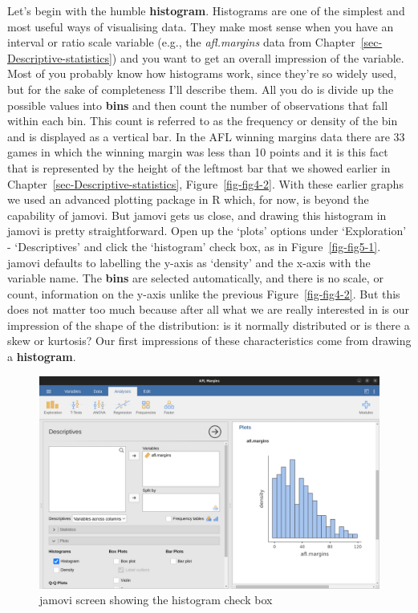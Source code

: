 \documentclass[
  a4paper,
]{book}
\begin{document}
Let's begin with the humble \textbf{histogram}. Histograms are one of
the simplest and most useful ways of visualising data. They make most
sense when you have an interval or ratio scale variable (e.g., the
\emph{afl.margins} data from Chapter~\ref{sec-Descriptive-statistics})
and you want to get an overall impression of the variable. Most of you
probably know how histograms work, since they're so widely used, but for
the sake of completeness I'll describe them. All you do is divide up the
possible values into \textbf{bins} and then count the number of
observations that fall within each bin. This count is referred to as the
frequency or density of the bin and is displayed as a vertical bar. In
the AFL winning margins data there are 33 games in which the winning
margin was less than 10 points and it is this fact that is represented
by the height of the leftmost bar that we showed earlier in
Chapter~\ref{sec-Descriptive-statistics}, Figure~\ref{fig-fig4-2}. With
these earlier graphs we used an advanced plotting package in R which,
for now, is beyond the capability of jamovi. But jamovi gets us close,
and drawing this histogram in jamovi is pretty straightforward. Open up
the `plots' options under `Exploration' - `Descriptives' and click the
`histogram' check box, as in Figure~\ref{fig-fig5-1}. jamovi defaults to
labelling the y-axis as `density' and the x-axis with the variable name.
The \textbf{bins} are selected automatically, and there is no scale, or
count, information on the y-axis unlike the previous
Figure~\ref{fig-fig4-2}. But this does not matter too much because after
all what we are really interested in is our impression of the shape of
the distribution: is it normally distributed or is there a skew or
kurtosis? Our first impressions of these characteristics come from
drawing a \textbf{histogram}.

\begin{figure}

\includegraphics[width=1\textwidth,height=\textheight]{images/fig5-2.png} \hfill{}

\caption{\label{fig-fig5-2}jamovi screen showing the histogram check
box}

\end{figure}
\end{document}
